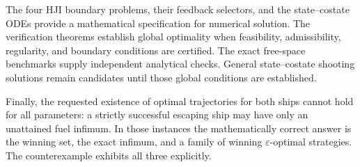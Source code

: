 \documentclass[journal,a4paper]{IEEEtran}
\begin{document}
The four HJI boundary problems, their feedback selectors, and the state--costate ODEs provide a mathematical specification for numerical solution. The verification theorems establish global optimality when feasibility, admissibility, regularity, and boundary conditions are certified. The exact free-space benchmarks supply independent analytical checks. General state--costate shooting solutions remain candidates until those global conditions are established.

Finally, the requested existence of optimal trajectories for both ships cannot hold for all parameters: a strictly successful escaping ship may have only an unattained fuel infimum. In those instances the mathematically correct answer is the winning set, the exact infimum, and a family of winning $\varepsilon$-optimal strategies. The counterexample exhibits all three explicitly.



\end{document}
